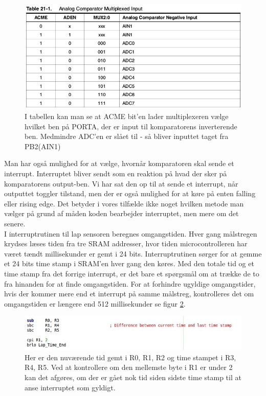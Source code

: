 \begin{figure}[h]

	\centering
		\includegraphics[scale=0.3]{Billeder/Table21-1.jpg}
	\caption{I tabellen kan man se at ACME bit'en lader multiplexeren vælge hvilket ben på PORTA, der er input til komparatorens inverterende ben. Medmindre ADC'en er slået til - så bliver inputtet taget fra PB2(AIN1)}
	\label{fig:ACME}
	
\end{figure}

Man har også mulighed for at vælge, hvornår komparatoren skal sende et interrupt. Interruptet bliver sendt som en reaktion på hvad der sker på komparatorens output-ben. Vi har sat den op til at sende et interrupt, når outputtet toggler tilstand, men der er også mulighed for at køre på enten falling eller rising edge. Det betyder i vores tilfælde ikke noget hvilken metode man vælger på grund af måden koden bearbejder interruptet, men mere om det senere.\\

I interruptrutinen til lap sensoren beregnes omgangstiden. Hver gang målstregen krydses læses tiden fra tre SRAM addresser, hvor tiden microcontrolleren har været tændt millisekunder er gemt i 24 bits. Interruptrutinen sørger for at gemme et 24 bits time stamp i SRAM'en hver gang den køres. Med den totale tid og et time stamp fra det forrige interrupt, er det bare et spørgsmål om at trække de to fra hinanden for at finde omgangstiden. For at forhindre ugyldige omgangstider, hvis der kommer mere end et interrupt på samme målstreg, kontrolleres det om omgangstiden er længere end 512 millisekunder se figur \ref{fig:LapTime}.

\begin{figure}[h]

	\centering
		\includegraphics[scale=0.5]{Billeder/LapTime.jpg}
	\caption{Her er den nuværende tid gemt i R0, R1, R2 og time stampet i R3, R4, R5. Ved at kontrollere om den mellemste byte i R1 er under 2 kan det afgøres, om der er gået nok tid siden sidste time stamp til at anse interruptet som gyldigt.}
	\label{fig:LapTime}
	
\end{figure}

